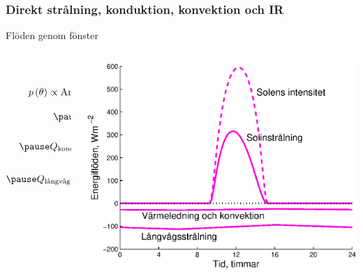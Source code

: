 \subsubsection{Direkt strålning, konduktion, konvektion och IR}
\begin{frame}{Flöden genom fönster}
  \begin{columns}
    \begin{column}{.48\textwidth}
      {\small
      \begin{eqnarray*}
        g\left( \theta \right) = g_0 \cdot p\left( \theta \right)\\[10pt]
        p\left( \theta \right) \propto \text{Antal rutor \& beläggningar}\\[10pt]
        \pause Q_{\text{sol}} =  g\left( \theta \right) \cdot I_0 \cos{\left( \theta \right)}\\[10pt]
        \pause Q_{\text{kond}} = \frac{1}{\frac{1}{U}+\frac{1}{h}} \left( T_{inne} - T_{ute}\right)\\[10pt]
        \pause Q_{\text{långvåg}} = 0,75 \cdot \sigma \left( T_{inne}^4 - T_{ute}^4\right)
      \end{eqnarray*}
      }
    \end{column}


    \begin{column}{.5\textwidth}
      \pause
      \vspace{-30pt}
      \begin{center}
        \includegraphics[scale=0.4]{images/windows_flow.eps}
      \end{center}
    \end{column}
  \end{columns}
\end{frame}
